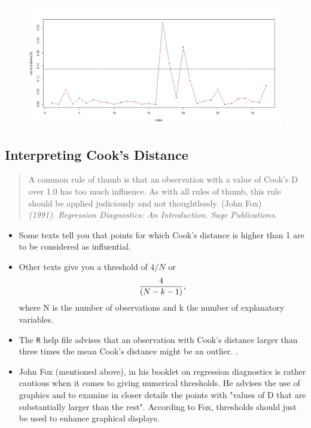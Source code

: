 \documentclass[residuals.tex]{subfiles}
\begin{document}
	\begin{figure}[h!]
		\centering
		\includegraphics[width=0.9\linewidth]{cooksplot}
		\caption{}
		\label{fig:cooksplot}
	\end{figure}
	
	
	\bigskip
	
	
	\subsection{Interpreting Cook's Distance}
	\begin{quote}
		A common rule of thumb is that an observation with a value of Cook's D over 1.0 has too much influence. As with all rules of thumb, this rule should be applied judiciously and not thoughtlessly. (John Fox)\\ \textit{(1991). Regression Diagnostics: An Introduction. Sage Publications.}
	\end{quote}
	\bigskip
	\begin{itemize}
		\item Some texts tell you that points for which Cook's distance is higher than 1 are to be considered as influential. 
		\item Other texts give you a threshold of $4/N$ or \[ {4  \over (N-k-1)} ,\] where N is the number of observations and k the number of explanatory variables. 
		\item The \texttt{R} help file advises that an observation with Cook's distance larger than three times the mean Cook's distance might be an outlier. .
		
		\item John Fox (mentioned above), in his booklet on regression diagnostics is rather cautious when it comes to giving numerical thresholds. He advises the use of graphics and to examine in closer details the points with "values of D that are substantially larger than the rest". According to Fox, thresholds should just be used to enhance graphical displays.
	\end{itemize}
	
\end{document}
